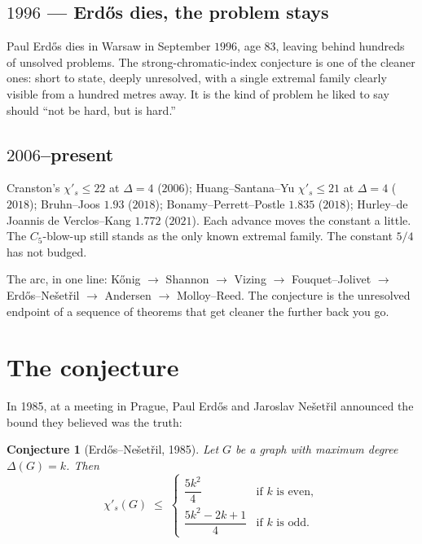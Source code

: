 \documentclass[11pt]{article}
\newcommand{\sci}{\chi'_s}
\newtheorem*{conjecture*}{Conjecture}
\begin{document}
\subsection*{$1996$ --- Erd\H{o}s dies, the problem stays}

Paul Erd\H{o}s dies in Warsaw in September $1996$, age $83$, leaving
behind hundreds of unsolved problems. The strong-chromatic-index
conjecture is one of the cleaner ones: short to state, deeply
unresolved, with a single extremal family clearly visible from a
hundred metres away. It is the kind of problem he liked to
say should ``not be hard, but is hard.''

\subsection*{$2006$--present}

Cranston's $\sci \leq 22$ at $\Delta = 4$ ($2006$); Huang--Santana--Yu
$\sci \leq 21$ at $\Delta = 4$ ($2018$); Bruhn--Joos $1.93$
($2018$); Bonamy--Perrett--Postle $1.835$ ($2018$); Hurley--de
Joannis de Verclos--Kang $1.772$ ($2021$). Each advance moves the
constant a little. The $C_5$-blow-up still stands as the only
known extremal family. The constant $5/4$ has not budged.

The arc, in one line: K\H{o}nig $\to$ Shannon $\to$ Vizing
$\to$ Fouquet--Jolivet $\to$ Erd\H{o}s--Ne\v{s}et\v{r}il
$\to$ Andersen $\to$ Molloy--Reed. The conjecture is the
unresolved endpoint of a sequence of theorems that get cleaner
the further back you go.

\section*{The conjecture}

In 1985, at a meeting in Prague, Paul Erd\H{o}s and Jaroslav
Ne\v{s}et\v{r}il announced the bound they believed was the truth:

\begin{conjecture*}[Erd\H{o}s--Ne\v{s}et\v{r}il, 1985]
Let $G$ be a graph with maximum degree $\Delta(G) = k$. Then
\[
\sci(G) \;\leq\;
\begin{cases}
\dfrac{5k^2}{4}                       & \text{if } k \text{ is even}, \\[6pt]
\dfrac{5k^2 - 2k + 1}{4}              & \text{if } k \text{ is odd}.
\end{cases}
\]
\end{conjecture*}
\end{document}
